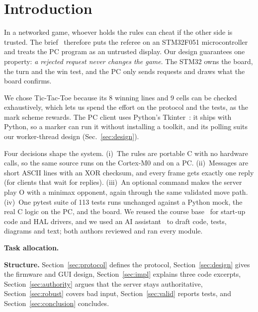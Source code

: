 \section{Introduction}
\label{sec:intro}

In a networked game, whoever holds the rules can cheat if the other side is trusted. The
brief~\cite{brief} therefore puts the referee on an STM32F051 microcontroller and treats the PC
program as an untrusted display. Our design guarantees one property: \emph{a rejected request
never changes the game}. The STM32 owns the board, the turn and the win test, and the PC only
sends requests and draws what the board confirms.

We chose Tic-Tac-Toe because its 8 winning lines and 9 cells can be checked exhaustively, which
lets us spend the effort on the protocol and the tests, as the mark scheme rewards. The PC client uses
Python's Tkinter~\cite{guilib}: it ships with Python, so a marker can run it without installing a
toolkit, and its  polling suits our worker-thread design (Sec.~\ref{sec:design}).

Four decisions shape the system. (i)~The rules are portable C with no hardware calls, so the same
source runs on the Cortex-M0 and on a PC. (ii)~Messages are short ASCII lines with an XOR checksum, and
every frame gets exactly one reply (for clients that wait for replies). (iii)~An optional  command makes the server play O with a minimax opponent, again through the same validated move path. (iv)~One pytest suite of 113 tests runs unchanged against a
Python mock, the real C logic on the PC, and the board. We reused the course
base~\cite{coursebase} for start-up code and HAL drivers, and we used an AI assistant~\cite{aiuse}
to draft code, tests, diagrams and text; both authors reviewed and ran every module.

\textbf{Task allocation.} 

\textbf{Structure.} Section~\ref{sec:protocol} defines the protocol, Section~\ref{sec:design} gives the
firmware and GUI design, Section~\ref{sec:impl} explains three code excerpts,
Section~\ref{sec:authority} argues that the server stays authoritative,
Section~\ref{sec:robust} covers bad input, Section~\ref{sec:valid} reports tests, and
Section~\ref{sec:conclusion} concludes.
